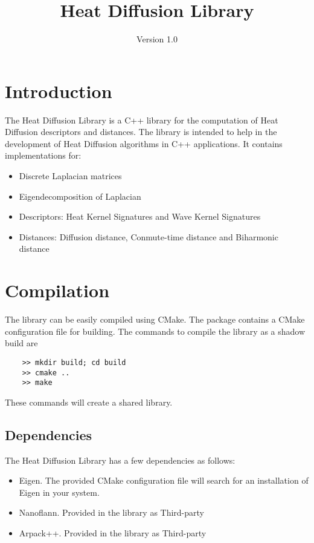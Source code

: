 \documentclass[a4paper,10pt]{article}
\title{Heat Diffusion Library}
\author{Version 1.0}
\date{}
\begin{document}
\maketitle

\section{Introduction}
The Heat Diffusion Library is a C++ library for the computation of Heat Diffusion descriptors and distances. The library is intended to help 
in the development of Heat Diffusion algorithms in C++ applications. It contains implementations for:

\begin{itemize}
 \item Discrete Laplacian matrices
 \item Eigendecomposition of Laplacian
 \item Descriptors: Heat Kernel Signatures and Wave Kernel Signatures
 \item Distances: Diffusion distance, Conmute-time distance and Biharmonic distance
\end{itemize}

\section{Compilation}
The library can be easily compiled using CMake. The package contains a CMake configuration file for building. The commands to compile 
the library as a shadow build are

\begin{verbatim}
    >> mkdir build; cd build
    >> cmake ..
    >> make
\end{verbatim}

These commands will create a shared library.

\subsection{Dependencies}
The Heat Diffusion Library has a few dependencies as follows:

\begin{itemize}
 \item Eigen. The provided CMake configuration file will search for an installation of Eigen in your system.
 \item Nanoflann. Provided in the library as Third-party
 \item Arpack++. Provided in the library as Third-party
\end{itemize}
\end{document}

